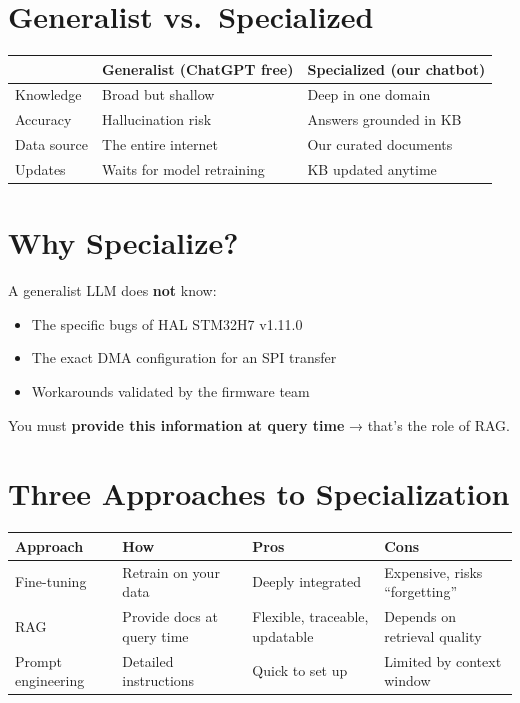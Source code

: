 \documentclass[11pt,a4paper]{report}
\begin{document}
\section{Generalist vs.\ Specialized}

\begin{table}[h]
\centering
\begin{tabularx}{\textwidth}{l X X}
\toprule
& \textbf{Generalist (ChatGPT free)} & \textbf{Specialized (our chatbot)} \\
\midrule
Knowledge & Broad but shallow & Deep in one domain \\
Accuracy & Hallucination risk & Answers grounded in KB \\
Data source & The entire internet & Our curated documents \\
Updates & Waits for model retraining & KB updated anytime \\
\bottomrule
\end{tabularx}
\end{table}

\section{Why Specialize?}

A generalist LLM does \textbf{not} know:
\begin{itemize}
    \item The specific bugs of HAL STM32H7 v1.11.0
    \item The exact DMA configuration for an SPI transfer
    \item Workarounds validated by the firmware team
\end{itemize}

You must \textbf{provide this information at query time} → that's the role of RAG.

\section{Three Approaches to Specialization}

\begin{table}[h]
\centering
\begin{tabularx}{\textwidth}{l X X X}
\toprule
\textbf{Approach} & \textbf{How} & \textbf{Pros} & \textbf{Cons} \\
\midrule
Fine-tuning & Retrain on your data & Deeply integrated & Expensive, risks ``forgetting'' \\
RAG & Provide docs at query time & Flexible, traceable, updatable & Depends on retrieval quality \\
Prompt engineering & Detailed instructions & Quick to set up & Limited by context window \\
\bottomrule
\end{tabularx}
\end{table}
\end{document}
